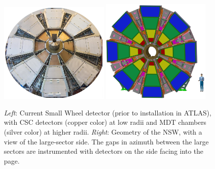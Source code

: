 \begin{figure}[!htb]
    \begin{center}
        \includegraphics[width=0.48\textwidth]{figures/nsw/nsw_current_sw}
        \includegraphics[width=0.48\textwidth]{figures/nsw/nsw_cartoon}
        \caption{
            \textit{Left}: Current Small Wheel detector (prior to installation in ATLAS), with CSC detectors (copper color) at low radii
                and MDT chambers (silver color) at higher radii.
            \textit{Right}: Geometry of the NSW, with a view of the large-sector side. The gaps in azimuth
                between the large sectors are instrumented with detectors on the side facing into the page.
        }
        \label{fig:nsw_geo}
    \end{center}
\end{figure}

